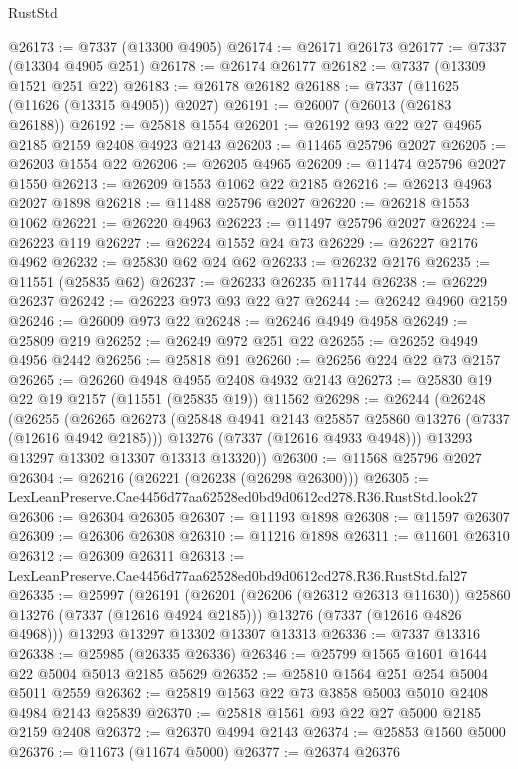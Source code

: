 \begin{lexlean}{RustStd}
\begin{coremodule}
@26173 := @7337 (@13300 @4905)
@26174 := @26171 @26173
@26177 := @7337 (@13304 @4905 @251)
@26178 := @26174 @26177
@26182 := @7337 (@13309 @1521 @251 @22)
@26183 := @26178 @26182
@26188 := @7337 (@11625 (@11626 (@13315 @4905)) @2027)
@26191 := @26007 (@26013 (@26183 @26188))
@26192 := @25818 @1554
@26201 := @26192 @93 @22 @27 @4965 @2185 @2159 @2408 @4923 @2143
@26203 := @11465 @25796 @2027
@26205 := @26203 @1554 @22
@26206 := @26205 @4965
@26209 := @11474 @25796 @2027 @1550
@26213 := @26209 @1553 @1062 @22 @2185
@26216 := @26213 @4963 @2027 @1898
@26218 := @11488 @25796 @2027
@26220 := @26218 @1553 @1062
@26221 := @26220 @4963
@26223 := @11497 @25796 @2027
@26224 := @26223 @119
@26227 := @26224 @1552 @24 @73
@26229 := @26227 @2176 @4962
@26232 := @25830 @62 @24 @62
@26233 := @26232 @2176
@26235 := @11551 (@25835 @62)
@26237 := @26233 @26235 @11744
@26238 := @26229 @26237
@26242 := @26223 @973 @93 @22 @27
@26244 := @26242 @4960 @2159
@26246 := @26009 @973 @22
@26248 := @26246 @4949 @4958
@26249 := @25809 @219
@26252 := @26249 @972 @251 @22
@26255 := @26252 @4949 @4956 @2442
@26256 := @25818 @91
@26260 := @26256 @224 @22 @73 @2157
@26265 := @26260 @4948 @4955 @2408 @4932 @2143
@26273 := @25830 @19 @22 @19 @2157 (@11551 (@25835 @19)) @11562
@26298 := @26244
    (@26248
      (@26255
        (@26265
          @26273
          (@25848 @4941 @2143 @25857 @25860 @13276 (@7337 (@12616 @4942 @2185)))
          @13276
          (@7337 (@12616 @4933 @4948)))
        @13293
        @13297
        @13302
        @13307
        @13313
        @13320))
@26300 := @11568 @25796 @2027
@26304 := @26216 (@26221 (@26238 (@26298 @26300)))
@26305 := LexLeanPreserve.Cae4456d77aa62528ed0bd9d0612cd278.R36.RustStd.look27
@26306 := @26304 @26305
@26307 := @11193 @1898
@26308 := @11597 @26307
@26309 := @26306 @26308
@26310 := @11216 @1898
@26311 := @11601 @26310
@26312 := @26309 @26311
@26313 := LexLeanPreserve.Cae4456d77aa62528ed0bd9d0612cd278.R36.RustStd.fal27
@26335 := @25997
    (@26191
      (@26201 (@26206 (@26312 @26313 @11630)) @25860 @13276 (@7337 (@12616 @4924 @2185)))
      @13276
      (@7337 (@12616 @4826 @4968)))
    @13293
    @13297
    @13302
    @13307
    @13313
@26336 := @7337 @13316
@26338 := @25985 (@26335 @26336)
@26346 := @25799 @1565 @1601 @1644 @22 @5004 @5013 @2185 @5629
@26352 := @25810 @1564 @251 @254 @5004 @5011 @2559
@26362 := @25819 @1563 @22 @73 @3858 @5003 @5010 @2408 @4984 @2143 @25839
@26370 := @25818 @1561 @93 @22 @27 @5000 @2185 @2159 @2408
@26372 := @26370 @4994 @2143
@26374 := @25853 @1560 @5000
@26376 := @11673 (@11674 @5000)
@26377 := @26374 @26376

\end{coremodule}
\end{lexlean}
